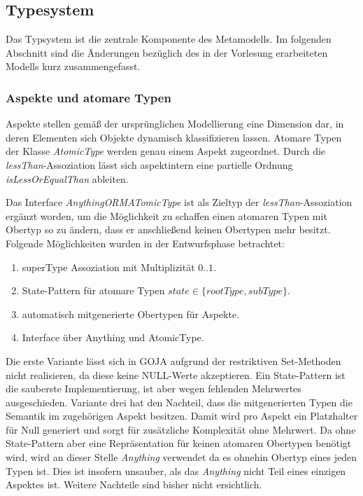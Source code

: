 \subsection{Typesystem}
Das Typsystem ist die zentrale Komponente des Metamodells. Im folgenden Abschnitt sind die 
Änderungen bezüglich des in der Vorlesung erarbeiteten Modells kurz zusammengefasst.

\subsubsection{Aspekte und atomare Typen}

Aspekte stellen gemäß der ursprünglichen Modellierung eine Dimension dar, in deren Elementen sich Objekte dynamisch klassifizieren lassen. 
Atomare Typen der Klasse \emph{AtomicType} werden genau einem Aspekt zugeordnet. Durch die \emph{lessThan}-Assoziation lässt sich aspektintern eine 
partielle Ordnung \emph{isLessOrEqualThan} ableiten.  


Das Interface \emph{AnythingORMATomicType} ist als Zieltyp der \emph{lessThan}-Assoziation ergänzt worden, 
um die Möglichkeit zu schaffen einen atomaren Typen mit Obertyp so zu ändern, dass er anschließend keinen 
Obertypen mehr besitzt. Folgende Möglichkeiten wurden in der Entwurfsphase betrachtet: 
\begin{enumerate}
  		\item superType Assoziation mit Multiplizität $0..1$.
		\item State-Pattern für atomare Typen \(state \in \{rootType, subType\}\).
        \item automatisch mitgenerierte Obertypen für Aspekte.
        \item Interface über Anything und AtomicType.
\end{enumerate}

Die erste Variante lässt sich in GOJA aufgrund der restriktiven Set-Methoden nicht realisieren, da diese keine NULL-Werte akzeptieren.
Ein State-Pattern ist die sauberste Implementierung, ist aber wegen fehlenden Mehrwertes ausgeschieden. 
Variante drei hat den Nachteil, dass die mitgenerierten Typen die Semantik  im zugehörigen Aspekt besitzen.
Damit wird pro Aspekt ein Platzhalter für Null generiert und sorgt für zusätzliche Komplexität ohne Mehrwert. 
Da ohne State-Pattern aber eine Repräsentation für keinen atomaren Obertypen benötigt wird, wird an dieser Stelle \emph{Anything} verwendet 
da es ohnehin Obertyp eines jeden Typen ist. Dies ist insofern unsauber, als das \emph{Anything} nicht Teil eines einzigen Aspektes ist.
Weitere Nachteile sind bisher nicht ersichtlich.


